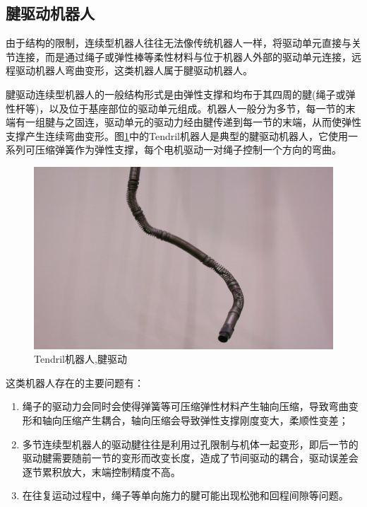\subsection{腱驱动机器人}
由于结构的限制，连续型机器人往往无法像传统机器人一样，将驱动单元直接与关节连接，而是通过绳子或弹性棒等柔性材料与位于机器人外部的驱动单元连接，远程驱动机器人弯曲变形，这类机器人属于腱驱动机器人。
 
腱驱动连续型机器人的一般结构形式是由弹性支撑和均布于其四周的腱(绳子或弹性杆等)，以及位于基座部位的驱动单元组成。机器人一般分为多节，每一节的末端有一组腱与之固连，驱动单元的驱动力经由腱传递到每一节的末端，从而使弹性支撑产生连续弯曲变形。图\ref{fig:tendril}中的Tendril机器人是典型的腱驱动机器人，它使用一系列可压缩弹簧作为弹性支撑，每个电机驱动一对绳子控制一个方向的弯曲\cite{mehling_minimally_2006}。
\begin{figure}[!htbp]
	\centering
	\includegraphics[width=.75\textwidth]{figures/tendril.png}
	\caption{Tendril机器人,腱驱动}
	\label{fig:tendril}
\end{figure}
 
这类机器人存在的主要问题有：
\begin{enumerate}
	\item 绳子的驱动力会同时会使得弹簧等可压缩弹性材料产生轴向压缩，导致弯曲变形和轴向压缩产生耦合，轴向压缩会导致弹性支撑刚度变大，柔顺性变差；
	\item 多节连续型机器人的驱动腱往往是利用过孔限制与机体一起变形，即后一节的驱动腱需要随前一节的变形而改变长度，造成了节间驱动的耦合，驱动误差会逐节累积放大，末端控制精度不高。
	\item 在往复运动过程中，绳子等单向施力的腱可能出现松弛\cite{hannan_kinematics_2003}和回程间隙\cite{bardou_control_2010}等问题。
\end{enumerate}
 
